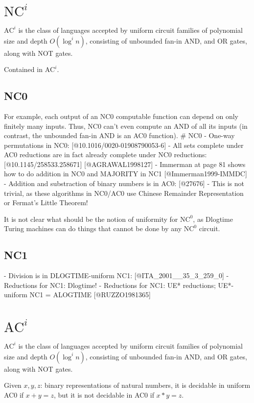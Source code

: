 \section{\texorpdfstring{$\text{NC}^i$}{NC\string^i}}
$\text{AC}^i$ is the class of languages accepted by uniform circuit
families of polynomial size and depth $O(\log^i n)$, consisting of unbounded fan-in
AND, and OR gates, along with NOT gates.

Contained in $\text{AC}^i$.

\subsection{NC0}
For example, each output of an NC0 computable function can depend on only finitely many
inputs. Thus, NC0 can't even compute an AND of all its inputs (in contrast, the unbounded
fan-in AND is an AC0 function).
# NC0
- One-way permutations in NC0: [@10.1016/0020-01908790053-6]
- All sets complete under AC0 reductions are in fact already complete under NC0 reductions: [@10.1145/258533.258671] [@AGRAWAL1998127]
- Immerman at page 81 shows how to do addition in NC0 and MAJORITY in NC1 [@Immerman1999-IMMDC]
- Addition and substraction of binary numbers is in AC0: [@27676]
- This is not trivial, as these algorithms in NC0/AC0 use Chinese Remainder Representation or Fermat's Little Theorem!



It is not clear what should be the notion of uniformity for $\text{NC}^0$,
as Dlogtime Turing machines can do things that cannot be done by
any $\text{NC}^0$ circuit.
\subsection{NC1}
- Division is in DLOGTIME-uniform NC1: [@ITA_2001__35_3_259_0]
- Reductions for NC1: Dlogtime!
- Reductions for NC1: UE* reductions; UE*-uniform NC1 = ALOGTIME [@RUZZO1981365]


\section{\texorpdfstring{$\text{AC}^i$}{AC\string^i}}
$\text{AC}^i$ is the class of languages accepted by uniform circuit
families of polynomial size and depth $O(\log^i n)$, consisting of unbounded fan-in
AND, and OR gates, along with NOT gates.

Given $x, y, z$: binary representations of natural numbers,
it is decidable in uniform AC0 if $x + y = z$, but it is not decidable 
in AC0 if $x * y = z$.

